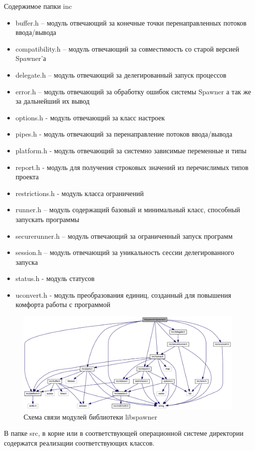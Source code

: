 \documentclass{imcs}
\begin{document}
Содержимое папки inc
\begin{itemize}
  \item buffer.h – модуль отвечающий за конечные точки перенаправленных потоков ввода/вывода
  \item compatibility.h – модуль отвечающий за совместимость со старой версией Spawner'а
  \item delegate.h – модуль отвечающий за делегированный запуск процессов
  \item error.h – модуль отвечающий за обработку ошибок системы Spawner а так же за дальнейший их вывод
  \item options.h - модуль отвечающий за класс настроек
  \item pipes.h - модуль отвечающий за перенаправление потоков ввода/вывода
  \item platform.h - модуль отвечающий за системно зависимые переменные и типы
  \item report.h - модуль для получения строковых значений из перечислимых типов проекта
  \item restrictions.h - модуль класса ограничений
  \item runner.h – модуль содержащий базовый и минимальный класс, способный запускать программы
  \item securerunner.h – модуль отвечающий за ограниченный запуск программ
  \item session.h – модуль отвечающий за уникальность сессии делегированного запуска
  \item status.h - модуль статусов
  \item uconvert.h - модуль преобразования единиц, созданный для повышения комфорта работы с программой
\end{itemize}
\FloatBarrier 
\begin{figure}[htb]
\centering
\includegraphics{./img/libspawner.png}
\caption{Схема связи модулей библиотеки libspawner}
\label{libspawner}
\end{figure}
В папке src, в корне или в соответствующей операционной системе директории содержатся реализации соответствующих классов.
\end{document}
